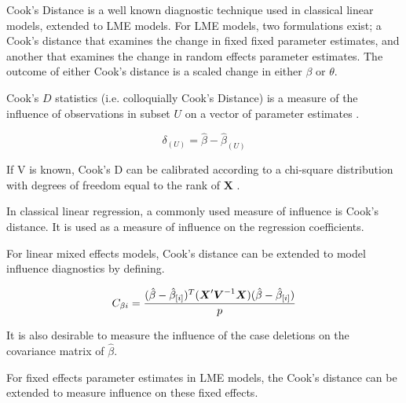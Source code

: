 \documentclass[Main.tex]{subfiles}
\begin{document}
	
	Cook's Distance is a well known diagnostic technique used in classical linear models, extended to LME models.  For LME models, two formulations exist; a Cook's distance that examines the change in fixed fixed parameter estimates, and another that examines the change in random effects parameter estimates. The outcome of either Cook's distance is a scaled change in either $\beta$ or $\theta$.
	
	
	 Cook's $D$ statistics (i.e. colloquially Cook's Distance) is a measure of the influence of observations in subset $U$ on a vector of parameter estimates \citep{cook77}.
	
	
	\[ \delta_{(U)} = \hat{\beta} - \hat{\beta}_{(U)}\]
	
	
	If V is known, Cook's D can be calibrated according to a chi-square distribution with degrees of freedom equal to the rank of $\boldsymbol{X}$ \citep{cpj92}.
	
	
	
	
	In classical linear regression, a commonly used measure of influence is Cook's distance. It is used as a measure of influence on the regression coefficients.
	
	
	For linear mixed effects models, Cook's distance can be extended to model influence diagnostics by defining.
	
	
	\[ C_{\beta i} = {(\hat{\beta} - \hat{\beta}_{[i]})^{T}(\boldsymbol{X}^{\prime}\boldsymbol{V}^{-1}\boldsymbol{X}) (\hat{\beta} - \hat{\beta}_{[i]}) \over p}\]
	
	
	It is also desirable to measure the influence of the case deletions on the covariance matrix of $\hat{\beta}$.
	
	
	
	
	
	
	
	
	For fixed effects parameter estimates in LME models, the  Cook's distance can be extended to measure influence on these fixed effects.
	
\end{document}
